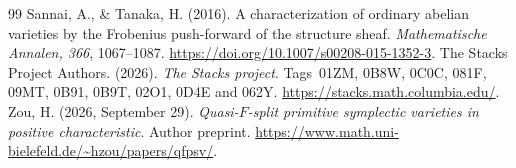 \documentclass[11pt]{article}
\theoremstyle{definition}\newtheorem{definition}[theorem]{Definition}
\theoremstyle{remark}\newtheorem{remark}[theorem]{Remark}
\begin{document}
\begin{thebibliography}{99}
Sannai, A., \& Tanaka, H. (2016). A characterization of ordinary abelian varieties by the Frobenius push-forward of the structure sheaf. \emph{Mathematische Annalen, 366}, 1067--1087. \url{https://doi.org/10.1007/s00208-015-1352-3}.
The Stacks Project Authors. (2026). \emph{The Stacks project}. Tags~01ZM, 0B8W, 0C0C, 081F, 09MT, 0B91, 0B9T, 02O1, 0D4E and 062Y. \url{https://stacks.math.columbia.edu/}.
Zou, H. (2026, September 29). \emph{Quasi-$F$-split primitive symplectic varieties in positive characteristic}. Author preprint. \url{https://www.math.uni-bielefeld.de/~hzou/papers/qfpsv/}.
\end{thebibliography}
\end{document}
